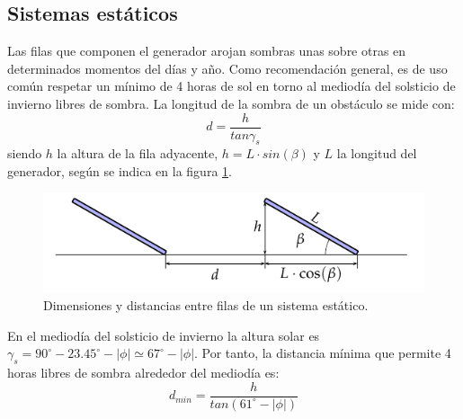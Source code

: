 \subsection{Sistemas estáticos}
\label{sec:org0d6e9c4}
Las filas que componen el generador arojan sombras unas sobre otras en determinados momentos del días y año. Como recomendación general, es de uso común respetar un mínimo de 4 horas de sol en torno al mediodía del solsticio de invierno libres de sombra. La longitud de la sombra de un obstáculo se mide con:
\begin{equation}
d = \frac{h}{tan\gamma_s}
\end{equation}
siendo \(h\) la altura de la fila adyacente, \(h=L\cdot sin(\beta)\) y \(L\) la longitud del generador, según se indica en la figura \ref{fig:sombras-estaticos}.
\begin{figure}[htbp]
\centering
\includegraphics[width=.9\linewidth]{figuras/SombrasEstaticas.pdf}
\caption{Dimensiones y distancias entre filas de un sistema estático. \label{fig:sombras-estaticos}}
\end{figure}

En el mediodía del solsticio de invierno la altura solar es \(\gamma_s = 90^\circ - 23.45^\circ - |\phi| \simeq 67^\circ - |\phi|\). Por tanto, la distancia mínima que permite 4 horas libres de sombra alrededor del mediodía es:
\begin{equation}
d_{min}=\frac{h}{tan(61^\circ - |\phi|)}
\end{equation}

